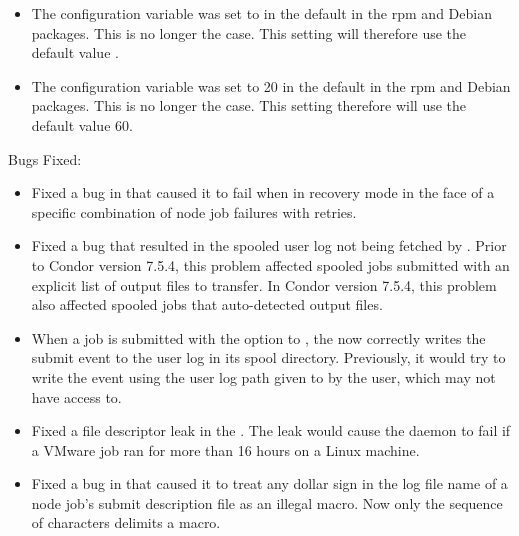 \begin{itemize}
\item The configuration variable 
  was set to  in the default 
  in the rpm and Debian packages.  This is no longer the case.
  This setting will therefore use the default value .

\item The configuration variable  was set
  to 20 in the default  in the rpm and
  Debian packages.  This is no longer the case.  This setting
  therefore will use the default value 60.

\end{itemize}

\noindent Bugs Fixed:

\begin{itemize}

\item Fixed a bug in  that caused it to fail when in recovery
mode in the face of a specific combination of node job failures with
retries.

\item Fixed a bug that resulted in the spooled user log not being
  fetched by .  Prior to Condor version 7.5.4, this
  problem affected spooled jobs submitted with an explicit list of
  output files to transfer.  In Condor version 7.5.4, this problem also
  affected spooled jobs that auto-detected output files.

\item When a job is submitted with the  option to ,
the  now correctly writes the submit event to the user log 
in its spool directory. 
Previously, it would try to write the event using the user
log path given to  by the user, 
which  may not have access to.

\item Fixed a file descriptor leak in the . The leak would
cause the daemon to fail if a VMware job ran for more than 16 hours on a
Linux machine.

\item Fixed a bug in  that caused it to treat any dollar
sign in the log file name of a node job's submit description file
as an illegal  macro.
Now only the sequence of characters \Expr{\$(} delimits a macro.

\end{itemize}

